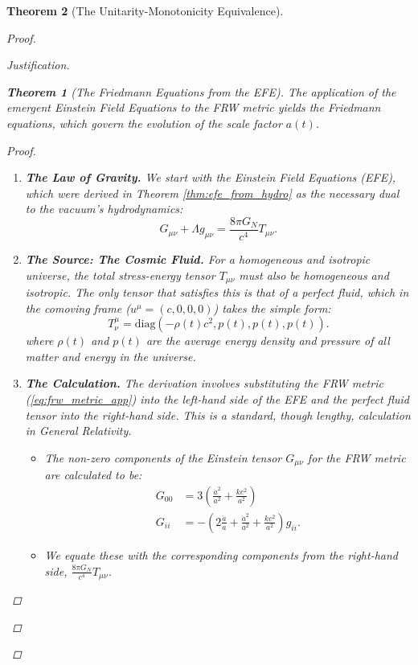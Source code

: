 \documentclass[11pt, letterpaper]{report}
\theoremstyle{plain} %
\newtheorem{theorem}{Theorem}[chapter]
\theoremstyle{definition} %
\theoremstyle{remark} %
\begin{document}
\begin{theorem}[The Unitarity-Monotonicity Equivalence]
\begin{proof}
\begin{proof}[Justification]
\begin{theorem}[The Friedmann Equations from the EFE]
The application of the emergent Einstein Field Equations to the FRW metric yields the Friedmann equations, which govern the evolution of the scale factor $a(t)$.
\end{theorem}
\begin{proof}
\begin{enumerate}
    \item \textbf{The Law of Gravity.} We start with the Einstein Field Equations (EFE), which were derived in Theorem \ref{thm:efe_from_hydro} as the necessary dual to the vacuum's hydrodynamics:
    \begin{equation}
        G_{\mu\nu} + \Lambda g_{\mu\nu} = \frac{8\pi G_N}{c^4} T_{\mu\nu}.
    \end{equation}

    \item \textbf{The Source: The Cosmic Fluid.} For a homogeneous and isotropic universe, the total stress-energy tensor $T_{\mu\nu}$ must also be homogeneous and isotropic. The only tensor that satisfies this is that of a perfect fluid, which in the comoving frame ($u^\mu = (c,0,0,0)$) takes the simple form:
    \begin{equation}
        T^\mu_\nu = \text{diag}(-\rho(t)c^2, p(t), p(t), p(t)).
    \end{equation}
    where $\rho(t)$ and $p(t)$ are the average energy density and pressure of all matter and energy in the universe.

    \item \textbf{The Calculation.} The derivation involves substituting the FRW metric (\cref{eq:frw_metric_app}) into the left-hand side of the EFE and the perfect fluid tensor into the right-hand side. This is a standard, though lengthy, calculation in General Relativity.
    \begin{itemize}
        \item The non-zero components of the Einstein tensor $G_{\mu\nu}$ for the FRW metric are calculated to be:
        \begin{align}
            G_{00} &= 3\left( \frac{\dot{a}^2}{a^2} + \frac{kc^2}{a^2} \right) \\
            G_{ii} &= -\left( 2\frac{\ddot{a}}{a} + \frac{\dot{a}^2}{a^2} + \frac{kc^2}{a^2} \right)g_{ii}.
        \end{align}
        \item We equate these with the corresponding components from the right-hand side, $ \frac{8\pi G_N}{c^4}T_{\mu\nu}$.
    \end{itemize}


\end{enumerate}
\end{proof}
\end{proof}
\end{proof}
\end{theorem}
\end{document}
